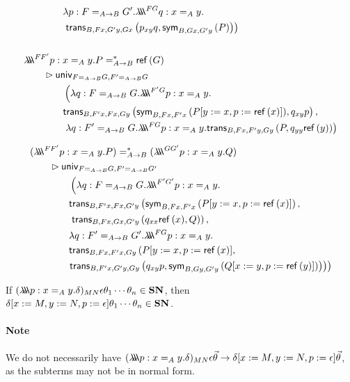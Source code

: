 \begin{align*}
& \qquad \qquad \lambda p : F =_{A \rightarrow B} G'. \triplelambda^{F G} q : x =_A y. \\
& \qquad \qquad \left. \trans{B}{Fx}{G'y}{Gx}{p_{xy} q}{\sym{B}{Gx}{G'y}{P}} \right) \\ \\
& \triplelambda^{F F'} p : x =_A y. P =^*_{A \rightarrow B} \reff{G}
  \\ & \qquad \rhd
\mathsf{univ}_{F =_{A \rightarrow B} G,F' =_{A \rightarrow B} G} \\
& \qquad \qquad \left( \lambda q : F =_{A \rightarrow B} G .
\triplelambda^{F' G} p : x =_A y. \right. \\
& \qquad \qquad \trans{B}{F'x}{Fx}{Gy}{\sym{B}{Fx}{F'x}{P [ y := x, p := \reff{x} ] }}
{
 q_{xy}p}, \\
& \qquad \qquad \left. \lambda q:F'=_{A \rightarrow B} G. \triplelambda^{FG} p : x =_A y.
\trans{B}{Fx}{F'y}{Gy}{P}{q_{yy} \reff{y}} \right)
\end{align*}

\begin{align*}
& (\triplelambda^{F F'} p : x =_A y. P) =^*_{A \rightarrow B} (\triplelambda^{G G'} p : x =_A y . Q)
 \\ & \qquad \rhd 
\mathsf{univ}_{F =_{A \rightarrow B} G,F' =_{A \rightarrow B} G'} \\
& \qquad \qquad \left( \lambda q : F =_{A \rightarrow B} G . \triplelambda^{F' G'} p : x =_A y. \right. \\
& \qquad \qquad \mathsf{trans}_{B,F'x,Fx,G'y} \left( \sym{B}{Fx}{F'x}{P [ y := x, p := \reff{x} ]} , \right. \\
& \qquad \qquad \left. \trans{B}{Fx}{Gx}{G'y}{q_{xx} \reff{x}}{Q} \right) , \\
& \qquad \qquad \lambda q : F' =_{A \rightarrow B} G' . \triplelambda^{FG} p : x =_A y. \\
& \qquad \qquad \mathsf{trans}_{B, Fx, F'x, Gy} \left( P [ y := x,  p := \reff{x} ] , \right. \\
& \qquad \qquad \! \! \left. \left. \trans{B}{F'x}{G'y}{Gy}{q_{xy} p}{\sym{B}{Gy}{G'y}{Q [ x := y, p := \reff{y} ] }} \right) \right)
\end{align*}

\begin{lm}
If $(\lambda \!\! \lambda \!\! \lambda p:x =_A y.\delta)_{MN} \epsilon \theta_1 \cdots \theta_n \in \mathbf{SN}$, then $\delta[x:=M, y:=N, p:=\epsilon] \theta_1 \cdots \theta_n \in \mathbf{SN}$.
\end{lm}

\paragraph{Note}
We do not necessarily have $(\lambda \!\! \lambda \!\! \lambda p:x =_A y.\delta)_{MN} \epsilon \vec{\theta} \rightarrow \delta[x:=M, y:=N, p:=\epsilon] \vec{\theta}$, as the
subterms may not be in normal form.


